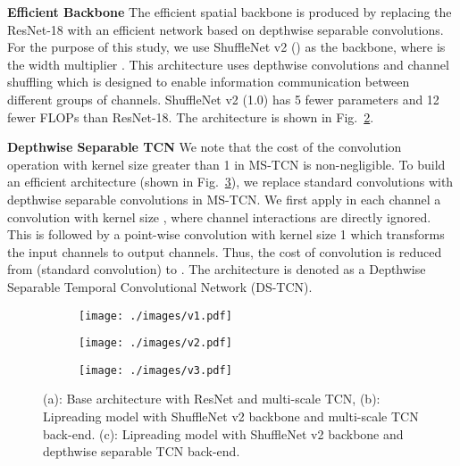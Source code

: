 \documentclass{article}
\begin{document}
\noindent\textbf{Efficient Backbone}\quad
The efficient spatial backbone is produced by replacing the ResNet-18 with an efficient network based on depthwise separable convolutions. For the purpose of this study, we use ShuffleNet v2 () as the backbone, where  is the width multiplier \cite{ma2018shufflenet}. This architecture uses depthwise convolutions and channel shuffling which is designed to enable information communication between different groups of channels. ShuffleNet v2 (1.0) has 5 fewer parameters and 12 fewer FLOPs than ResNet-18. The architecture is shown in Fig.~\ref{fig:variations_b}.

\noindent\textbf{Depthwise Separable TCN}\quad
We note that the cost of the convolution operation with kernel size greater than 1 in MS-TCN is non-negligible. To build an efficient architecture (shown in Fig.~\ref{fig:variations_c}), we replace standard convolutions with depthwise separable convolutions in MS-TCN. We first apply in each channel a convolution with kernel size , where channel interactions are directly ignored. This is followed by a point-wise convolution with kernel size 1 which transforms the  input channels  to  output channels.  Thus, the cost of convolution is reduced from  (standard convolution) to . The architecture is denoted as a Depthwise Separable Temporal Convolutional Network (DS-TCN). 

\begin{figure}[t]
    \centering
    \begin{subfigure}{.22\columnwidth}
    \texttt{[image: ./images/v1.pdf]}
    \caption{}
    \label{fig:variations_a}  
    \end{subfigure}\hfill \begin{subfigure}{.22\columnwidth}
    \texttt{[image: ./images/v2.pdf]}
    \caption{}
    \label{fig:variations_b}  
    \end{subfigure}\hfill \begin{subfigure}{.22\columnwidth}
    \texttt{[image: ./images/v3.pdf]}
    \caption{}
    \label{fig:variations_c}  
    \end{subfigure}
    
\caption[architecture]{(a): Base architecture with ResNet and multi-scale TCN, (b): Lipreading model with ShuffleNet v2 backbone and multi-scale TCN back-end. (c): Lipreading model with ShuffleNet v2 backbone and depthwise separable TCN back-end.
    }
\label{fig:architecture}
\vspace{-2mm}
\end{figure}
\end{document}
